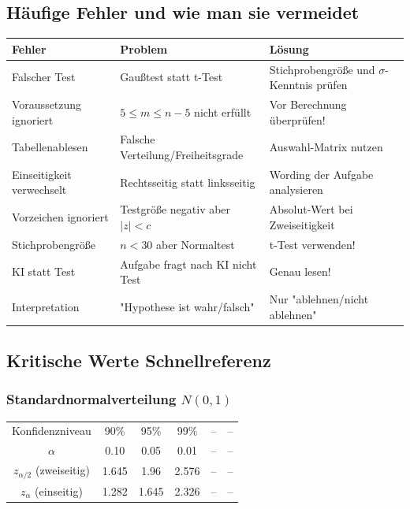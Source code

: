 \documentclass[10pt, a4paper, ngerman]{scrartcl}
\begin{document}
\subsection{Häufige Fehler und wie man sie vermeidet}

\begin{longtable}{|p{4cm}|p{3.5cm}|p{2.5cm}|}
  \hline
  \textbf{Fehler} & \textbf{Problem} & \textbf{Lösung} \\
  \hline
  \endhead
  
  Falscher Test & Gaußtest statt t-Test & Stichprobengröße und $\sigma$-Kenntnis prüfen \\
  \hline
  Voraussetzung ignoriert & $5 \leq m \leq n-5$ nicht erfüllt & Vor Berechnung überprüfen! \\
  \hline
  Tabellenablesen & Falsche Verteilung/Freiheitsgrade & Auswahl-Matrix nutzen \\
  \hline
  Einseitigkeit verwechselt & Rechtsseitig statt linksseitig & Wording der Aufgabe analysieren \\
  \hline
  Vorzeichen ignoriert & Testgröße negativ aber $|z| < c$ & Absolut-Wert bei Zweiseitigkeit \\
  \hline
  Stichprobengröße & $n < 30$ aber Normaltest & t-Test verwenden! \\
  \hline
  KI statt Test & Aufgabe fragt nach KI nicht Test & Genau lesen! \\
  \hline
  Interpretation & "Hypothese ist wahr/falsch" & Nur "ablehnen/nicht ablehnen" \\
  \hline
\end{longtable}

\subsection{Kritische Werte Schnellreferenz}

\subsubsection{Standardnormalverteilung $N(0,1)$}

\begin{tabular}{cccccc}
  Konfidenzniveau & 90\% & 95\% & 99\% & -- & -- \\
  $\alpha$ & 0.10 & 0.05 & 0.01 & -- & -- \\
  \hline
  $z_{\alpha/2}$ (zweiseitig) & 1.645 & 1.96 & 2.576 & -- & -- \\
  $z_\alpha$ (einseitig) & 1.282 & 1.645 & 2.326 & -- & -- \\
\end{tabular}
\end{document}

